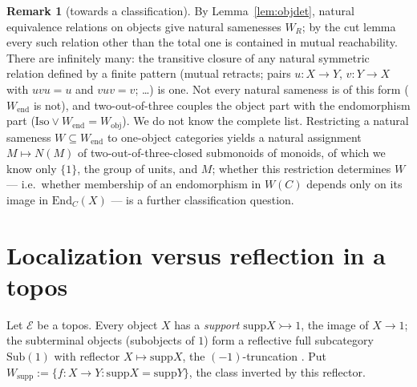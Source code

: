 \documentclass[11pt]{amsart}
\theoremstyle{definition}
\newtheorem{rem}[thm]{Remark}
\newcommand{\Iso}{\mathrm{Iso}}
\newcommand{\End}{\mathrm{End}}
\newcommand{\supp}{\mathrm{supp}}
\newcommand{\Wobj}{W_{\mathrm{obj}}}
\newcommand{\Wend}{W_{\mathrm{end}}}
\newcommand{\Wsupp}{W_{\mathrm{supp}}}
\newcommand{\Sub}{\mathrm{Sub}}
\begin{document}
\begin{rem}[towards a classification]\label{rem:classify}
By Lemma~\ref{lem:objdet}, natural equivalence relations on objects give
natural samenesses $W_R$; by the cut lemma every such relation other than the
total one is contained in mutual reachability. There are infinitely
many: the transitive closure of any natural symmetric relation defined by
a finite pattern (mutual retracts; pairs $u\colon X\to Y$, $v\colon Y\to X$ with
$uvu=u$ and $vuv=v$; \dots) is one. Not every natural sameness is of this
form ($\Wend$ is not), and two-out-of-three couples the object part with
the endomorphism part ($\Iso\vee\Wend=\Wobj$). We do not know the complete list. Restricting a natural sameness
$W\subseteq\Wend$ to one-object categories yields a natural assignment
$M\mapsto N(M)$ of two-out-of-three-closed submonoids of monoids, of which we
know only $\{1\}$, the group of units, and $M$; whether this restriction
determines $W$ --- i.e.\ whether membership of an endomorphism in $W(C)$
depends only on its image in $\End_C(X)$ --- is a further classification
question.
\end{rem}

\section{Localization versus reflection in a topos}\label{sec:topos}

Let $\mathcal E$ be a topos. Every object $X$ has a \emph{support}
$\supp X\rightarrowtail1$, the image of $X\to1$; the subterminal objects (subobjects
of $1$) form a reflective full subcategory $\Sub(1)$ with reflector
$X\mapsto\supp X$, the $(-1)$-truncation \cite[A1.3]{Elephant}. Put
$\Wsupp:=\{f\colon X\to Y:\supp X=\supp Y\}$, the class inverted by this
reflector.
\end{document}
